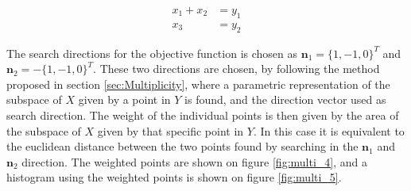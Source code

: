 \begin{equation}\label{eq:multi_constraint}
\begin{split}
x_1 + x_2 &= y_1 \\
x_3 &= y_2
\end{split}
\end{equation}

The search directions for the objective function is chosen as $\mathbf{n}_1 = \{1,-1,0\}^T$ and  $\mathbf{n}_2 = -\{1,-1,0\}^T$. These two directions are chosen, by following the method proposed in section \ref{sec:Multiplicity}, where a parametric representation of the subspace of $X$ given by a point in $Y$ is found, and the direction vector used as search direction. The weight of the individual points is then given by the area of the subspace of $X$ given by that specific point in $Y$. In this case it is equivalent to the euclidean distance between the two points found by searching in the $\mathbf{n}_1$ and $\mathbf{n}_2$ direction. The weighted points are shown on figure \ref{fig:multi_4}, and a histogram using the weighted points is shown on figure \ref{fig:multi_5}. 

